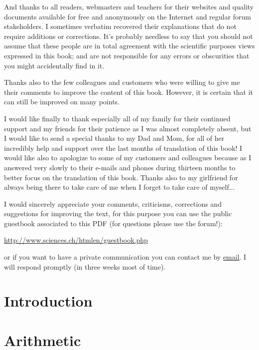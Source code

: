 \documentclass[12pt,a4paper,twoside,openright]{report}
\theoremstyle{definition}
\theoremstyle{itexmp}
\numberwithin{equation}{section}
\begin{document}
	And thanks to all readers, webmasters and teachers for their websites and quality documents available for free and anonymously on the Internet and regular forum stakeholders. I sometimes verbatim recovered their explanations that do not require additions or corrections. It's probably needless to say that you should not assume that these people are in total agreement with the scientific purposes views expressed in this book; and are not responsible for any errors or obscurities that you might accidentally find in it.
	
	Thanks also to the few colleagues and customers who were willing to give me their comments to improve the content of this book. However, it is certain that it can still be improved on many points.
	
	I would like finally to thank especially all of my family for their continued support and my friends for their patience as I was almost completely absent, but I would like to send a special thanks to my Dad and Mom, for all of her incredibly help and support over the last months of translation of this book! I would like also to apologize to some of my customers and colleagues because as I answered very slowly to their e-mails and phones during thirteen months to better focus on the translation of this book. Thanks also to my girlfriend for always being there to take care of me when I forget to take care of myself...
	
	I would sincerely appreciate your comments, criticisms, corrections and suggestions for improving the text, for this purpose you can use the public guestbook associated to this PDF (for questions please use the forum!):
	\begin{center}
	\url{http://www.sciences.ch/htmlen/guestbook.php}
	\end{center}
	or if you want to have a private communication you can contact me by {\href{mailto:info@sciences.ch}{{\color{blue}email}}}. I will respond promptly (in three weeks most of time).
	
\chapter{Introduction}
	
	\minitoc
	\pagebreak
	
	

\chapter{Arithmetic}
\end{document}
